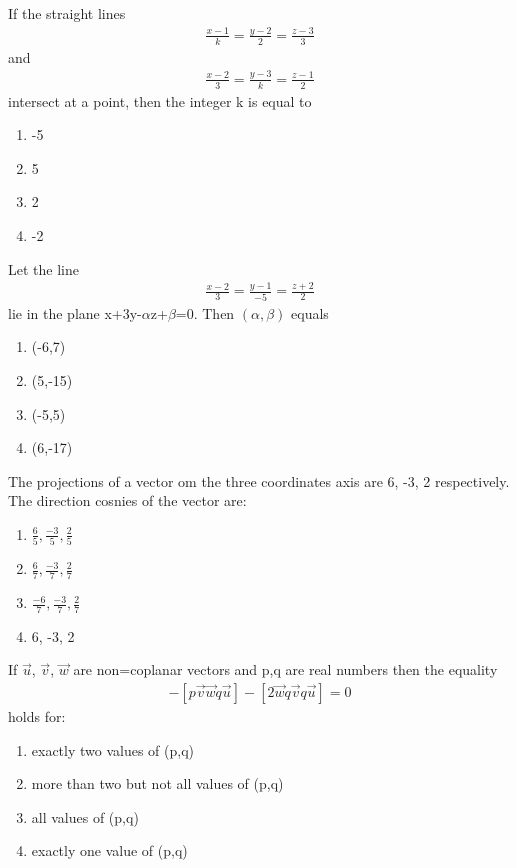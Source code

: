 \item If the straight lines 
\begin{align*}
\frac{x-1}{k}=\frac{y-2}{2}=\frac{z-3}{3}
\end{align*}
and 
\begin{align*}
\frac{x-2}{3}=\frac{y-3}{k}=\frac{z-1}{2}
\end{align*}
intersect at a point, then the integer k is equal to
\begin{enumerate}
\item -5
\item 5
\item 2
\item -2
\end{enumerate}

\item Let the line
\begin{align*}
\frac{x-2}{3}=\frac{y-1}{-5}=\frac{z+2}{2}
\end{align*}
lie in the plane x+3y-$\alpha$z+$\beta$=0. Then $(\alpha, \beta)$ equals
\begin{enumerate}
\item (-6,7)
\item (5,-15)
\item (-5,5)
\item (6,-17)
\end{enumerate}

\item The projections of a vector om the three coordinates axis are 6, -3, 2 respectively. The direction cosnies of the vector are:
\begin{enumerate}
\item $\frac{6}{5},\frac{-3}{5},\frac{2}{5}$
\item $\frac{6}{7},\frac{-3}{7},\frac{2}{7}$
\item $\frac{-6}{7},\frac{-3}{7},\frac{2}{7}$
\item 6, -3, 2
\end{enumerate}

\item If $\overrightarrow{u}$, $\overrightarrow{v}$, $\overrightarrow{w}$ are non=coplanar vectors and p,q are real numbers then the equality
\begin{align*}
[3\overrightarrow{u}p\overrightarrow{v}p\overrightarrow{w}]-[p\overrightarrow{v}\overrightarrow{w}q\overrightarrow{u}]-[2\overrightarrow{w}q\overrightarrow{v}q\overrightarrow{u}]=0
\end{align*}
holds for:
\begin{enumerate}
\item exactly two values of (p,q)
\item more than two but not all values of (p,q)
\item all values of (p,q)
\item exactly one value of (p,q)
\end{enumerate}


